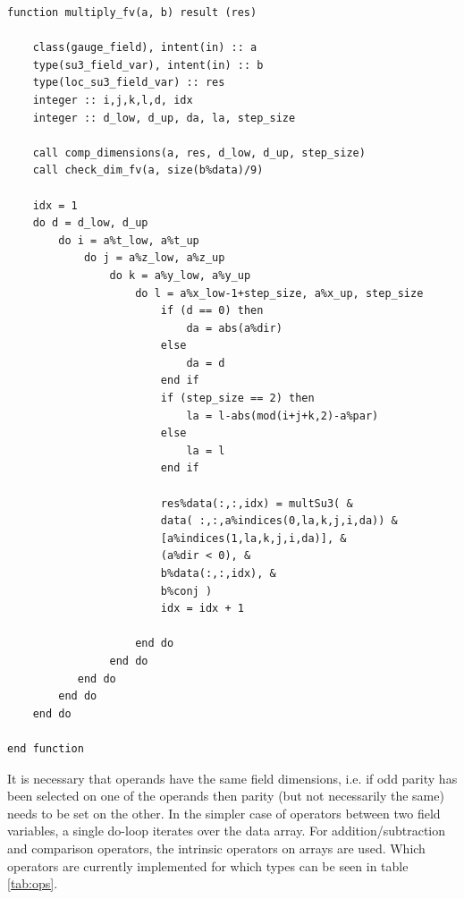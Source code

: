 \documentclass[graybox]{svmult}
\begin{document}
\begin{lstlisting}[caption={Multiplication operator between a \emph{gauge\_field} and an \emph{su3\_field\_var}. The function multSu3 is a wrapper around the Basic Linear Algebra Subroutines (BLAS) function cgemm. The second and fourth argument indicate whether the matrix should be conjugated.}]
function multiply_fv(a, b) result (res)
    
    class(gauge_field), intent(in) :: a
    type(su3_field_var), intent(in) :: b
    type(loc_su3_field_var) :: res
    integer :: i,j,k,l,d, idx
    integer :: d_low, d_up, da, la, step_size

    call comp_dimensions(a, res, d_low, d_up, step_size)
    call check_dim_fv(a, size(b%data)/9)

    idx = 1
    do d = d_low, d_up
        do i = a%t_low, a%t_up
            do j = a%z_low, a%z_up
                do k = a%y_low, a%y_up
                    do l = a%x_low-1+step_size, a%x_up, step_size
                        if (d == 0) then
                            da = abs(a%dir)
                        else
                            da = d
                        end if
                        if (step_size == 2) then
                            la = l-abs(mod(i+j+k,2)-a%par)
                        else
                            la = l
                        end if

                        res%data(:,:,idx) = multSu3( &
                        data( :,:,a%indices(0,la,k,j,i,da)) &
                        [a%indices(1,la,k,j,i,da)], &
                        (a%dir < 0), &
                        b%data(:,:,idx), &
                        b%conj )
                        idx = idx + 1

                    end do
                end do
           end do
        end do
    end do

end function
\end{lstlisting}
It is necessary that operands have the same field dimensions, i.e. if odd parity has been selected on one of the operands then parity (but not necessarily the same) needs to be set on the other. In the simpler case of operators between two field variables, a single do-loop iterates over the data array. For addition/subtraction and comparison operators, the intrinsic operators on arrays are used. Which operators are currently implemented for which types can be seen in table \ref{tab:ops}.
\end{document}
